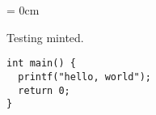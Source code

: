 \documentclass[11pt, letterpaper, oneside] {article}
\begin{document}
\parindent = 0cm

Testing minted.
\begin{verbatim}
int main() {
  printf("hello, world");
  return 0;
}
\end{verbatim}
\end{document}
